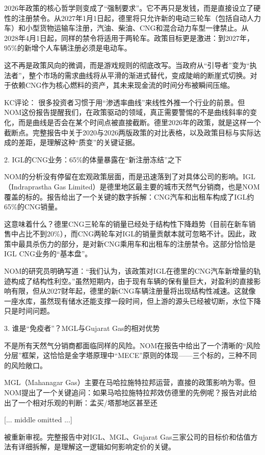 \documentclass[11pt]{ctexart}
\begin{document}
2026年政策的核心哲学则变成了“强制要求”。它不再只是发钱，而是直接设立了硬性的注册禁令。从2027年1月1日起，德里将只允许新的电动三轮车（包括自动人力车）和小型货物运输车注册，汽油、柴油、CNG和混合动力车型一律禁止。从2028年4月1日起，同样的禁令将适用于两轮车。政策目标更是激进：到2027年，95\%的新增个人车辆注册必须是电动车。

这不再是政策风向的微调，而是游戏规则的彻底改写。当政府从“引导者”变为“执法者”，整个市场的需求曲线将从平滑的渐进式替代，变成陡峭的断崖式切换。对于依赖CNG作为核心燃料的资产，其未来现金流的时间分布被瞬间压缩。

KC评论： 很多投资者习惯于用“渗透率曲线”来线性外推一个行业的前景。但NOM这份报告提醒我们，在政策驱动的领域，真正需要警惕的不是曲线斜率的变化，而是曲线是否会在某个时间点被直接截断。德里2026年的政策，就是这样一个截断点。完整报告中关于2020与2026两版政策的对比表格，以及政策目标与实际达成的差距，是理解这种“质变”的关键证据。

2. IGL的CNG业务：65\%的体量暴露在“新注册冻结”之下

NOM的分析没有停留在宏观政策层面，而是迅速落到了对具体公司的影响。IGL（Indraprastha Gas Limited）是德里地区最主要的城市天然气分销商，也是NOM覆盖的标的。报告给出了一个关键的数字拆解：CNG汽车和出租车构成了IGL约65\%的CNG销量。

这意味着什么？德里CNG三轮车的销量已经处于结构性下降趋势（目前在新车销售中占比不到20\%），而CNG两轮车对IGL的销量贡献本就可忽略不计。因此，政策中最具杀伤力的部分，是对新CNG乘用车和出租车的注册禁令。这部分恰恰是IGL CNG业务的“基本盘”。

NOM的研究员明确写道：“我们认为，该政策对IGL在德里的CNG汽车新增量的轨迹构成了结构性利空。”虽然短期内，由于现有车辆的保有量巨大，对盈利的直接影响有限，但从2027财年起，德里的新CNG车辆注册量将出现结构性减速。这就像一座水库，虽然现有储水还能支撑一段时间，但上游的源头已经被切断，水位下降只是时间问题。

3. 谁是“免疫者”？MGL与Gujarat Gas的相对优势

不是所有天然气分销商都面临同样的风险。NOM在报告中给出了一个清晰的“风险分层”框架，这恰恰是金字塔原理中“MECE”原则的体现——三个标的，三种不同的风险敞口。

MGL（Mahanagar Gas）主要在马哈拉施特拉邦运营，直接的政策影响为零。但NOM提出了一个关键追问：如果马哈拉施特拉邦效仿德里的先例呢？报告对此给出了一个相对乐观的判断：孟买/塔那地区甚至还

[... middle omitted ...]

被重新审视。完整报告中对IGL、MGL、Gujarat Gas三家公司的目标价和估值方法有详细拆解，是理解这一逻辑如何影响定价的关键。
\end{document}
